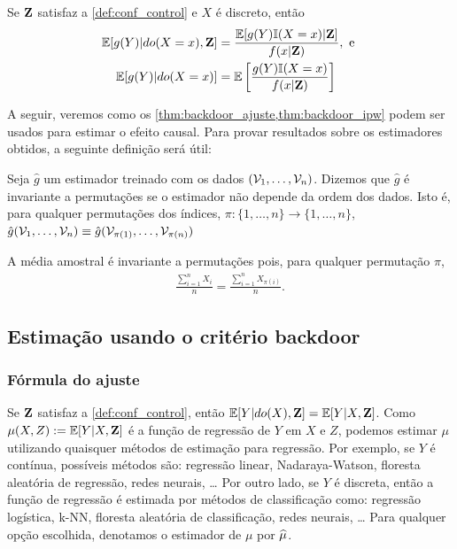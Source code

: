 \begin{theorem}
 \label{thm:backdoor_ipw}
 Se ${\mathbf{Z}}$ satisfaz 
 a \cref{def:conf_control} e
 $X$ é discreto, então
 \begin{align*}
  {\mathbb E}[g(Y)|do(X=x),{\mathbf{Z}}] 
  &= \frac{{\mathbb E}[g(Y){\mathbb I}(X=x)|{\mathbf{Z}}]}{f(x|{\mathbf{Z}})}, \text{ e } \\
  {\mathbb E}[g(Y)|do(X=x)]
  &= {\mathbb E}\left[\frac{g(Y){\mathbb I}(X=x)}{f(x|{\mathbf{Z}})}\right]
 \end{align*}
\end{theorem}

A seguir, veremos como os
\cref{thm:backdoor_ajuste,thm:backdoor_ipw} podem
ser usados para estimar o efeito causal.
Para provar resultados sobre os estimadores obtidos,
a seguinte definição será útil:

\begin{definition}
 \label{def:perm}
 Seja $\hat{g}$ um estimador treinado com
 os dados $({\mathcal V}_1,\ldots,{\mathcal V}_n)$.
 Dizemos que $\hat{g}$ é 
 invariante a permutações se
 o estimador não depende da ordem dos dados.
 Isto é, para qualquer permutações dos índices,
 $\pi: \{1,\ldots,n\} \rightarrow \{1,\ldots,n\}$,
 $\hat{g}({\mathcal V}_1,\ldots,{\mathcal V}_n) \equiv 
 \hat{g}({\mathcal V}_{\pi(1)},\ldots,{\mathcal V}_{\pi(n)})$
\end{definition}

\begin{example}
 \label{ex:perm}
 A média amostral é invariante a permutações pois,
 para qualquer permutação $\pi$,
 \begin{align*}
  \frac{\sum_{i=1}^n X_i}{n} 
  = \frac{\sum_{i=1}^n X_{\pi(i)}}{n}.
 \end{align*} 
\end{example}

\subsection{Estimação usando o critério backdoor}
\label{sec:backdoor_est}

\subsubsection{Fórmula do ajuste}

Se ${\mathbf{Z}}$ satisfaz a \cref{def:conf_control}, então
${\mathbb E}[Y|do(X),{\mathbf{Z}}] = {\mathbb E}[Y|X,{\mathbf{Z}}]$.
Como $\mu(X,Z) := {\mathbb E}[Y|X,{\mathbf{Z}}]$ é 
a função de regressão de $Y$ em $X$ e $Z$,
podemos estimar $\mu$ utilizando 
quaisquer métodos de estimação para regressão.
Por exemplo, se $Y$ é contínua,
possíveis métodos são:
regressão linear, Nadaraya-Watson, 
floresta aleatória de regressão, redes neurais, \ldots
Por outro lado, se $Y$ é discreta,
então a função de regressão é estimada por
métodos de classificação como:
regressão logística, k-NN, 
floresta aleatória de classificação,
redes neurais, \ldots
Para qualquer opção escolhida,
denotamos o estimador de $\mu$ por ${\widehat{\mu}}$.

